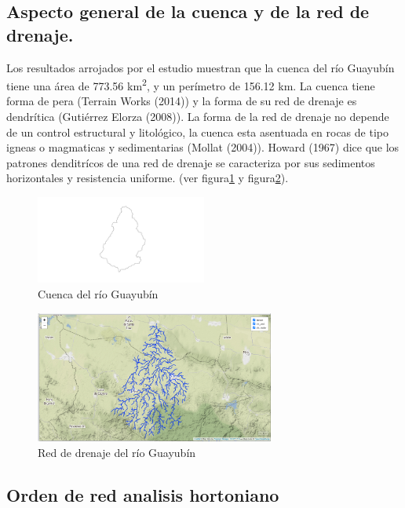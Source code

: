 \documentclass[11pt,]{article}
\begin{document}
\subsection{Aspecto general de la cuenca y de la red de
drenaje.}\label{aspecto-general-de-la-cuenca-y-de-la-red-de-drenaje.}

Los resultados arrojados por el estudio muestran que la cuenca del río
Guayubín tiene una área de 773.56 km\textsuperscript{2}, y un perímetro
de 156.12 km. La cuenca tiene forma de pera (Terrain Works (2014)) y la
forma de su red de drenaje es dendrítica (Gutiérrez Elorza (2008)). La
forma de la red de drenaje no depende de un control estructural y
litológico, la cuenca esta asentuada en rocas de tipo igneas o
magmaticas y sedimentarias (Mollat (2004)). Howard (1967) dice que los
patrones denditrícos de una red de drenaje se caracteriza por sus
sedimentos horizontales y resistencia uniforme. (ver
figura\ref{cuencavectorial} y figura\ref{red de drenaje extraida}).

\begin{figure}
\centering
\includegraphics[width=0.50000\textwidth]{cuenca extraida.png}
\caption{Cuenca del río Guayubín\label{cuencavectorial}}
\end{figure}

\begin{figure}
\centering
\includegraphics[width=0.70000\textwidth]{red de drenaje extraida.png}
\caption{Red de drenaje del río Guayubín\label{red de drenaje extraida}}
\end{figure}

\subsection{Orden de red analisis
hortoniano}\label{orden-de-red-analisis-hortoniano}
\end{document}
